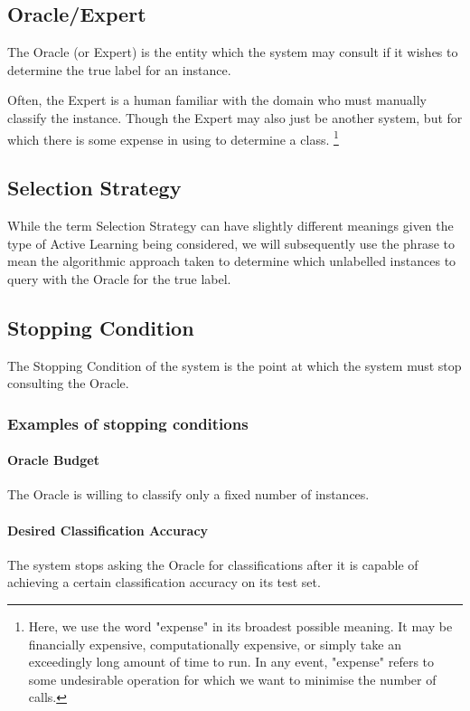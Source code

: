 \documentclass[a4paper,11pt]{report}
\begin{document}
\subsection{Oracle/Expert}
The Oracle (or Expert) is the entity which the system may consult if it wishes to determine the true label for an instance.

Often, the Expert is a human familiar with the domain who must manually classify the instance. Though the Expert may also just be another system, but for which there is some expense in using to determine a class. \footnote{Here, we use the word "expense" in its broadest possible meaning. It may be financially expensive, computationally expensive, or simply take an exceedingly long amount of time to run. In any event, "expense" refers to some undesirable operation for which we want to minimise the number of calls.}

\subsection{Selection Strategy}
While the term Selection Strategy can have slightly different meanings given the type of Active Learning being considered, we will subsequently use the phrase to mean the algorithmic approach taken to determine which unlabelled instances to query with the Oracle for the true label.

\subsection{Stopping Condition}
The Stopping Condition of the system is the point at which the system must stop consulting the Oracle.

\subsubsection{Examples of stopping conditions}
\paragraph{Oracle Budget} 
The Oracle is willing to classify only a fixed number of instances.

\paragraph{Desired Classification Accuracy} 
The system stops asking the Oracle for classifications after it is capable of achieving a certain classification accuracy on its test set.
\end{document}
